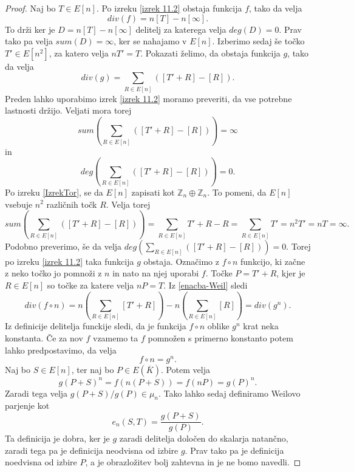 \documentclass[12pt,a4paper,twoside]{article}
\theoremstyle{definition} %
\theoremstyle{plain} %
\numberwithin{equation}{section}  %
\newcommand{\E}[1]{E({#1})}
\begin{document}
\begin{proof}
Naj bo $T \in E[n]$.
Po izreku \ref{izrek 11.2} obstaja funkcija $f$, tako da velja
\begin{equation}
\label{enacba-Weil}
div(f) = n[T]-n[\infty].
\end{equation}
To drži ker je $D = n[T]-n[\infty]$ delitelj za katerega velja $deg(D) = 0$. Prav tako pa velja $sum(D) = \infty$, ker se nahajamo v $E[n]$.
Izberimo sedaj še točko $T' \in E[n^2]$, za katero velja $nT' = T$. Pokazati želimo, da obstaja funkcija $g$, tako da velja
$$div(g) = \sum_{R \in E[n]}([T' + R]- [R]).$$
Preden lahko uporabimo izrek \ref{izrek 11.2} moramo preveriti, da vse potrebne lastnosti držijo. Veljati mora torej $$sum( \sum_{R \in E[n]}([T' + R]- [R])) = \infty$$ in $$deg( \sum_{R \in E[n]}([T' + R]- [R])) = 0.$$
Po izreku \ref{IzrekTor}, se da $E[n]$ zapisati kot $\mathbb{Z}_n \oplus \mathbb{Z}_n$. To pomeni, da $E[n]$ vsebuje $n^2$ različnih točk $R$. Velja torej
$$sum(\sum_{R \in E[n]}([T' + R]- [R])) = \sum_{R \in E[n]} T' +R-R = \sum_{R \in E[n]} T' = n^2T' = nT = \infty.$$
Podobno preverimo, še da velja $deg(\sum_{R \in E[n]}([T' + R]- [R])) = 0.$ Torej po izreku \ref{izrek 11.2} taka funkcija $g$ obstaja.
Označimo z $f \circ n$ funkcijo, ki začne z neko točko jo pomnoži z $n$ in nato na njej uporabi $f$. Točke $P = T' + R$, kjer je $R\in E[n]$ so točke za katere velja $nP=T$. Iz \ref{enacba-Weil}
sledi
$$div(f \circ n) = n(\sum_{R \in E[n]}[T' + R]) - n(\sum_{R \in E[n]}[R]) = div(g^n).$$
Iz definicije delitelja funckije sledi, da je funkcija $f \circ n$ oblike $g^n$ krat neka konstanta. Če za nov $f$ vzamemo ta $f$ pomnožen s primerno konstanto potem lahko predpostavimo, da velja
$$f \circ n = g^n.$$
Naj bo $S \in E[n]$, ter naj bo $P \in \E{\overline{K}}$. Potem velja
$$g(P+S)^n = f(n(P+S)) = f(nP) = g(P)^n.$$
Zaradi tega velja $g(P+S)/g(P) \in \mu_n$.
Tako lahko sedaj definiramo Weilovo parjenje kot
$$e_n(S,T) = \frac{g(P+S)}{g(P)}.$$
Ta definicija je dobra, ker je $g$ zaradi delitelja določen do skalarja natančno, zaradi tega pa je definicija neodvisna od izbire $g$. Prav tako pa je definicija noedvisna od izbire $P$, a je obrazložitev bolj zahtevna in je ne bomo navedli.


\end{proof}
\end{document}
